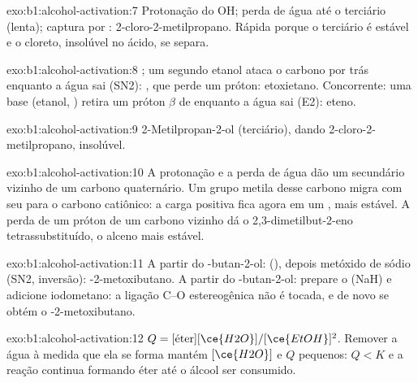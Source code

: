 \begin{solution}{exo:b1:alcohol-activation:7}
Protonação do OH; perda de água até o  terciário (lenta);
captura por : 2-cloro-2-metilpropano. Rápida porque o 
terciário é estável e o cloreto, insolúvel no ácido, se separa.
\end{solution}

\begin{solution}{exo:b1:alcohol-activation:8}
; um segundo etanol ataca o carbono por
trás enquanto a água sai (SN2): , que perde um próton:
etoxietano. Concorrente: uma base (etanol, ) retira um próton $\beta$
de  enquanto a água sai (E2): eteno.
\end{solution}

\begin{solution}{exo:b1:alcohol-activation:9}
2-Metilpropan-2-ol (terciário), dando 2-cloro-2-metilpropano, insolúvel.
\end{solution}

\begin{solution}{exo:b1:alcohol-activation:10}
A protonação e a perda de água dão um  secundário vizinho de
um carbono quaternário. Um grupo metila desse carbono migra com seu  para o carbono catiônico: a carga positiva fica agora em um
, mais estável. A perda de um próton de um carbono
vizinho dá o 2,3-dimetilbut-2-eno tetrassubstituído, o alceno mais estável.
\end{solution}

\begin{solution}{exo:b1:alcohol-activation:11}
A partir do -butan-2-ol:  (), depois metóxido de sódio
(SN2, inversão): -2-metoxibutano. A partir do -butan-2-ol:
prepare o  (NaH) e adicione iodometano: a ligação C--O
estereogênica não é tocada, e de novo se obtém o -2-metoxibutano.
\end{solution}

\begin{solution}{exo:b1:alcohol-activation:12}
$Q = [\text{éter}][\ce{H2O}]/[\ce{EtOH}]^2$. Remover a água à medida que
ela se forma mantém $[\ce{H2O}]$ e $Q$ pequenos: $Q < K$ e a reação
continua formando éter até o álcool ser consumido.
\end{solution}

